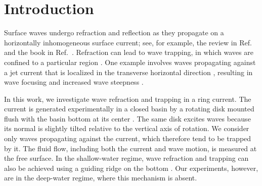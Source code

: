 \documentclass[aps,twocolumn]{revtex4-2}
\begin{document}
\maketitle

\section{Introduction}

Surface waves undergo refraction and reflection as they propagate on a horizontally inhomogeneous surface current; see, for example, the review in Ref.~\cite{peregrine1976interaction} and the book in Ref.~\cite{buhler2009waves}. Refraction can lead to wave trapping, in which waves are confined to a particular region \cite{kenyon1971wave}. One example involves waves propagating against a jet current that is localized in the transverse horizontal direction \cite{lavrenov1998wave,holthuijsen1991effects}, resulting in wave focusing and increased wave steepness \cite{quilfen2018storm}.

In this work, we investigate wave refraction and trapping in a ring current. The current is generated experimentally in a closed basin by a rotating disk mounted flush with the basin bottom at its center \cite{yang2019axisymmetric,piva2005steady}. The same disk excites waves because its normal is slightly tilted relative to the vertical axis of rotation. We consider only waves propagating against the current, which therefore tend to be trapped by it. The fluid flow, including both the current and wave motion, is measured at the free surface. In the shallow-water regime, wave refraction and trapping can also be achieved using a guiding ridge on the bottom \cite{sepulveda2020observation}. Our experiments, however, are in the deep-water regime, where this mechanism is absent.
\end{document}
